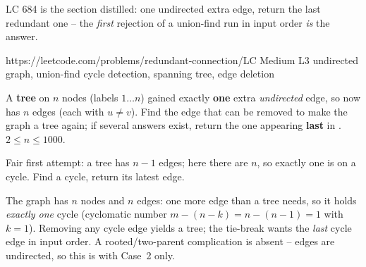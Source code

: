 LC 684 is the section distilled: one undirected extra edge, return the last redundant one -- the
\emph{first} rejection of a union-find run in input order \emph{is} the answer.

  {https://leetcode.com/problems/redundant-connection/}{LC Medium L3}
  {undirected graph, union-find cycle detection, spanning tree, edge deletion}

\begin{problemstatement}
A \textbf{tree} on $n$ nodes (labels $1\dots n$) gained exactly \textbf{one} extra \emph{undirected}
edge, so  now has $n$ edges (each \code{[u,v]} with $u\ne v$). Find the edge that can be
removed to make the graph a tree again; if several answers exist, return the one appearing
\textbf{last} in . $2\le n\le 1000$.
\end{problemstatement}

\begin{attemptgate}
Fair first attempt: a tree has $n-1$ edges; here there are $n$, so exactly one is on a cycle. Find a
cycle, return its latest edge.
\end{attemptgate}

The graph has $n$ nodes and $n$ edges: one more edge than a tree needs, so it holds \emph{exactly
one} cycle (cyclomatic number $m-(n-k)=n-(n-1)=1$ with $k=1$). Removing any cycle edge yields a tree;
the tie-break wants the \emph{last} cycle edge in input order. A rooted/two-parent complication is
absent -- edges are undirected, so this is  with Case~2 only.


